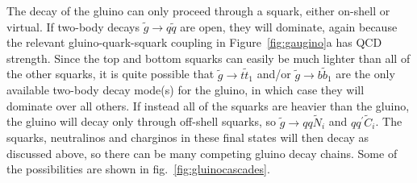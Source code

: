 \documentclass[12pt]{article}
\def\stilde{\widetilde}
\begin{document}
The decay of the gluino can only proceed through a squark, either on-shell 
or virtual.  If two-body decays $ \stilde g \rightarrow q\stilde q $ are 
open, they will dominate, again because the relevant gluino-quark-squark 
coupling in Figure~\ref{fig:gaugino}a has QCD strength.  Since the top and 
bottom squarks can easily be much lighter than all of the other squarks, 
it is quite possible that $ \stilde g \rightarrow t \stilde t_1$ and/or 
$\stilde g \rightarrow b \stilde b_1$ are the only available two-body 
decay mode(s) for the gluino, in which case they will dominate over all 
others. If instead all of the squarks are heavier than the gluino, the 
gluino will decay only through off-shell squarks, so $ \stilde g 
\rightarrow q q \stilde N_i$ and $ q q^\prime \stilde C_i $. The squarks, 
neutralinos and charginos in these final states will then decay as 
discussed above, so there can be many competing gluino decay chains. Some 
of the possibilities are shown in fig.~\ref{fig:gluinocascades}.
\end{document}
